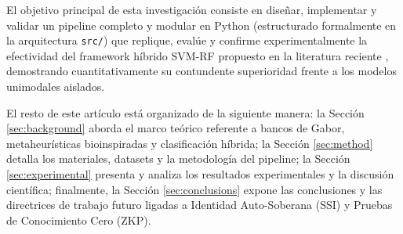 El objetivo principal de esta investigación consiste en diseñar, implementar y validar un pipeline completo y modular en Python (estructurado formalmente en la arquitectura \texttt{src/}) que replique, evalúe y confirme experimentalmente la efectividad del framework híbrido SVM-RF propuesto en la literatura reciente \cite{sonal2025}, demostrando cuantitativamente su contundente superioridad frente a los modelos unimodales aislados.

El resto de este artículo está organizado de la siguiente manera: la Sección \ref{sec:background} aborda el marco teórico referente a bancos de Gabor, metaheurísticas bioinspiradas y clasificación híbrida; la Sección \ref{sec:method} detalla los materiales, datasets y la metodología del pipeline; la Sección \ref{sec:experimental} presenta y analiza los resultados experimentales y la discusión científica; finalmente, la Sección \ref{sec:conclusions} expone las conclusiones y las directrices de trabajo futuro ligadas a Identidad Auto-Soberana (SSI) y Pruebas de Conocimiento Cero (ZKP).
